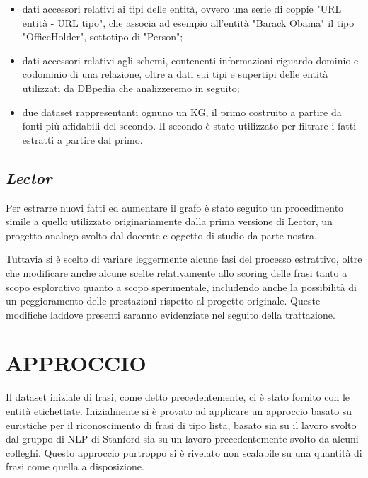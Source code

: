 \documentclass[10pt,a4paper,twocolumn]{article}
\begin{document}
\begin{itemize}
\item dati accessori relativi ai tipi delle entità, ovvero una serie di coppie "URL entità - URL tipo", che associa ad esempio all'entità "Barack Obama" il tipo "OfficeHolder", sottotipo di "Person";

\item dati accessori relativi agli schemi, contenenti informazioni riguardo dominio e codominio di una relazione, oltre a dati sui tipi e supertipi delle entità utilizzati da DBpedia che analizzeremo in seguito;

\item due dataset rappresentanti ognuno un KG, il primo costruito a partire da fonti più affidabili del secondo. Il secondo è stato utilizzato per filtrare i fatti estratti a partire dal primo.
\end{itemize}

\subsection*{\textit{Lector}}

Per estrarre nuovi fatti ed aumentare il grafo è stato seguito un procedimento simile a quello utilizzato originariamente dalla prima versione di Lector, un progetto analogo svolto dal docente e oggetto di studio da parte nostra. 

Tuttavia si è scelto di variare leggermente alcune fasi del processo estrattivo, oltre che modificare anche alcune scelte relativamente allo scoring delle frasi tanto a scopo esplorativo quanto a scopo sperimentale, includendo anche la possibilità di un peggioramento delle prestazioni rispetto al progetto originale. Queste modifiche laddove presenti saranno evidenziate nel seguito della trattazione.

\section{APPROCCIO}

Il dataset iniziale di frasi, come detto precedentemente, ci è stato fornito con le entità etichettate. Inizialmente si è provato ad applicare un approccio basato su euristiche per il riconoscimento di frasi di tipo lista, basato sia su il lavoro svolto dal gruppo di NLP di Stanford sia su un lavoro precedentemente svolto da alcuni colleghi. Questo approccio purtroppo si è rivelato non scalabile su una quantità di frasi come quella a disposizione. 
\end{document}

